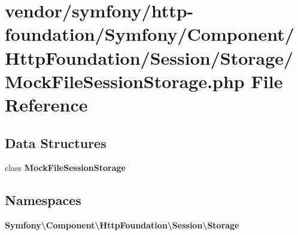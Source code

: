 \section{vendor/symfony/http-\/foundation/\+Symfony/\+Component/\+Http\+Foundation/\+Session/\+Storage/\+Mock\+File\+Session\+Storage.php File Reference}
\label{_mock_file_session_storage_8php}
\subsection*{Data Structures}
\begin{DoxyCompactItemize}
\item 
class {\bf Mock\+File\+Session\+Storage}
\end{DoxyCompactItemize}
\subsection*{Namespaces}
\begin{DoxyCompactItemize}
\item 
 {\bf Symfony\textbackslash{}\+Component\textbackslash{}\+Http\+Foundation\textbackslash{}\+Session\textbackslash{}\+Storage}
\end{DoxyCompactItemize}
